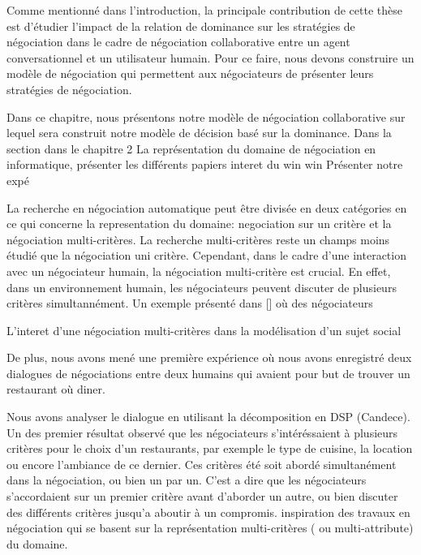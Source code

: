 
Comme mentionné dans l'introduction, la principale contribution de cette thèse est d'étudier l'impact de la relation de dominance sur les stratégies de négociation dans le cadre de négociation collaborative entre un agent conversationnel et un utilisateur humain. 
Pour ce faire, nous devons construire un modèle de négociation qui permettent aux négociateurs de présenter leurs stratégies de négociation. 

Dans ce chapitre, nous présentons notre modèle de négociation collaborative sur lequel sera construit notre modèle de décision basé sur la dominance. 
Dans la section 
 dans le chapitre 2
	La représentation du domaine de négociation en  informatique, présenter les différents papiers
	interet du win win
	Présenter notre expé
	
	
	La recherche en négociation automatique peut être divisée en deux catégories en ce qui concerne la representation du domaine: negociation sur un critère et la négociation multi-critères. La recherche multi-critères reste un champs moins étudié que la négociation uni critère. Cependant, dans le cadre d'une interaction avec un négociateur humain, la négociation multi-critère est crucial. En effet, dans un environnement humain, les négociateurs peuvent discuter de plusieurs critères simultannément. Un exemple présenté dans [] où des négociateurs
	

	L'interet d'une négociation multi-critères dans la modélisation d'un sujet social
	
	De plus, nous avons mené une première expérience où nous avons enregistré deux dialogues de négociations entre deux humains qui avaient pour but de trouver un restaurant où diner.
	
	Nous avons analyser le dialogue en utilisant la décomposition en DSP (Candece). Un des premier résultat observé que les négociateurs s'intéréssaient à plusieurs critères pour le choix d'un restaurants, par exemple le type de cuisine, la location ou encore l'ambiance de ce dernier. Ces critères été soit abordé simultanément dans la négociation, ou bien un par un. C'est a dire que les négociateurs s'accordaient sur un premier critère avant d'aborder un autre, ou bien discuter des différents critères jusqu'a aboutir à un compromis.
		inspiration des travaux en négociation qui se basent sur la représentation multi-critères ( ou multi-attribute) du domaine.
		
